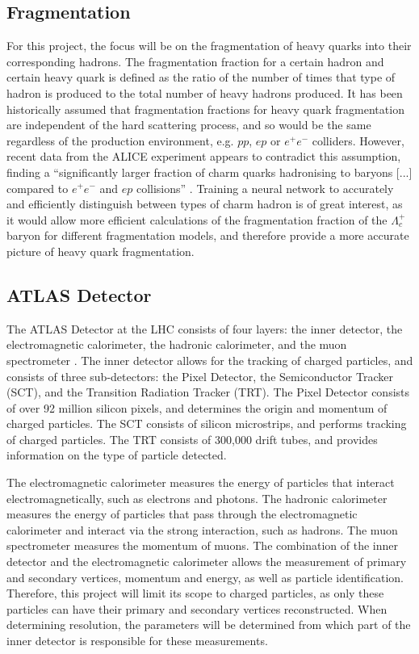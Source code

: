 \documentclass[12pt]{article}
\begin{document}
\subsection{Fragmentation}
For this project, the focus will be on the fragmentation of heavy quarks into their corresponding hadrons. The fragmentation fraction for a certain hadron and certain heavy quark is defined as the ratio of the number of times that type of hadron is produced to the total number of heavy hadrons produced. It has been historically assumed that fragmentation fractions for heavy quark fragmentation are independent of the hard scattering process, and so would be the same regardless of the production environment, e.g. $pp$, $ep$ or $e^+e^-$ colliders. However, recent data from the ALICE experiment appears to contradict this assumption, finding a ``significantly larger fraction of charm quarks hadronising to baryons [...] compared to $e^+e^-$ and $ep$ collisions'' \cite{alice2023charm}. Training a neural network to accurately and efficiently distinguish between types of charm hadron is of great interest, as it would allow more efficient calculations of the fragmentation fraction of the $\Lambda_c^+$ baryon for different fragmentation models, and therefore provide a more accurate picture of heavy quark fragmentation.

\subsection{ATLAS Detector}
The ATLAS Detector at the LHC consists of four layers: the inner detector, the electromagnetic calorimeter, the hadronic calorimeter, and the muon spectrometer \cite{atlas_detector_web}. The inner detector allows for the tracking of charged particles, and consists of three sub-detectors: the Pixel Detector, the Semiconductor Tracker (SCT), and the Transition Radiation Tracker (TRT). The Pixel Detector consists of over 92 million silicon pixels, and determines the origin and momentum of charged particles. The SCT consists of silicon microstrips, and performs tracking of charged particles. The TRT consists of 300,000 drift tubes, and provides information on the type of particle detected.

The electromagnetic calorimeter measures the energy of particles that interact electromagnetically, such as electrons and photons. The hadronic calorimeter measures the energy of particles that pass through the electromagnetic calorimeter and interact via the strong interaction, such as hadrons. The muon spectrometer measures the momentum of muons. The combination of the inner detector and the electromagnetic calorimeter allows the measurement of primary and secondary vertices, momentum and energy, as well as particle identification. Therefore, this project will limit its scope to charged particles, as only these particles can have their primary and secondary vertices reconstructed. When determining resolution, the parameters will be determined from which part of the inner detector is responsible for these measurements.
\end{document}
